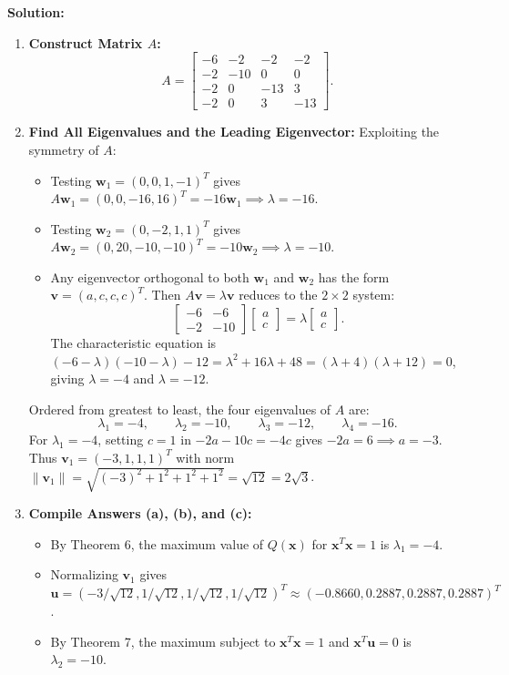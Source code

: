 \documentclass[11pt, letterpaper]{article}
\theoremstyle{definition}
\theoremstyle{remark}
\begin{document}
\textbf{Solution:}
\begin{enumerate}[label=\textbf{Step \arabic*:}]
    \item \textbf{Construct Matrix $A$:}
    \[
    A = \begin{bmatrix} -6 & -2 & -2 & -2 \\ -2 & -10 & 0 & 0 \\ -2 & 0 & -13 & 3 \\ -2 & 0 & 3 & -13 \end{bmatrix}.
    \]
    \item \textbf{Find All Eigenvalues and the Leading Eigenvector:}
    Exploiting the symmetry of $A$:
    \begin{itemize}
        \item Testing $\mathbf{w}_1 = (0, 0, 1, -1)^T$ gives $A\mathbf{w}_1 = (0, 0, -16, 16)^T = -16\mathbf{w}_1 \implies \lambda = -16$.
        \item Testing $\mathbf{w}_2 = (0, -2, 1, 1)^T$ gives $A\mathbf{w}_2 = (0, 20, -10, -10)^T = -10\mathbf{w}_2 \implies \lambda = -10$.
        \item Any eigenvector orthogonal to both $\mathbf{w}_1$ and $\mathbf{w}_2$ has the form $\mathbf{v} = (a, c, c, c)^T$. Then $A\mathbf{v} = \lambda \mathbf{v}$ reduces to the $2 \times 2$ system:
        \[
        \begin{bmatrix} -6 & -6 \\ -2 & -10 \end{bmatrix} \begin{bmatrix} a \\ c \end{bmatrix} = \lambda \begin{bmatrix} a \\ c \end{bmatrix}.
        \]
        The characteristic equation is $(-6-\lambda)(-10-\lambda) - 12 = \lambda^2 + 16\lambda + 48 = (\lambda + 4)(\lambda + 12) = 0$, giving $\lambda = -4$ and $\lambda = -12$.
    \end{itemize}
    Ordered from greatest to least, the four eigenvalues of $A$ are:
    \[
    \lambda_1 = -4, \qquad \lambda_2 = -10, \qquad \lambda_3 = -12, \qquad \lambda_4 = -16.
    \]
    For $\lambda_1 = -4$, setting $c = 1$ in $-2a - 10c = -4c$ gives $-2a = 6 \implies a = -3$. Thus $\mathbf{v}_1 = (-3, 1, 1, 1)^T$ with norm $\|\mathbf{v}_1\| = \sqrt{(-3)^2 + 1^2 + 1^2 + 1^2} = \sqrt{12} = 2\sqrt{3}$.
    \item \textbf{Compile Answers (a), (b), and (c):}
    \begin{itemize}
        \item[(a)] By Theorem 6, the maximum value of $Q(\mathbf{x})$ for $\mathbf{x}^T\mathbf{x} = 1$ is $\lambda_1 = -4$.
        \item[(b)] Normalizing $\mathbf{v}_1$ gives $\mathbf{u} = (-3/\sqrt{12}, 1/\sqrt{12}, 1/\sqrt{12}, 1/\sqrt{12})^T \approx (-0.8660, 0.2887, 0.2887, 0.2887)^T$.
        \item[(c)] By Theorem 7, the maximum subject to $\mathbf{x}^T\mathbf{x} = 1$ and $\mathbf{x}^T\mathbf{u} = 0$ is $\lambda_2 = -10$.
    \end{itemize}
\end{enumerate}
\end{document}
